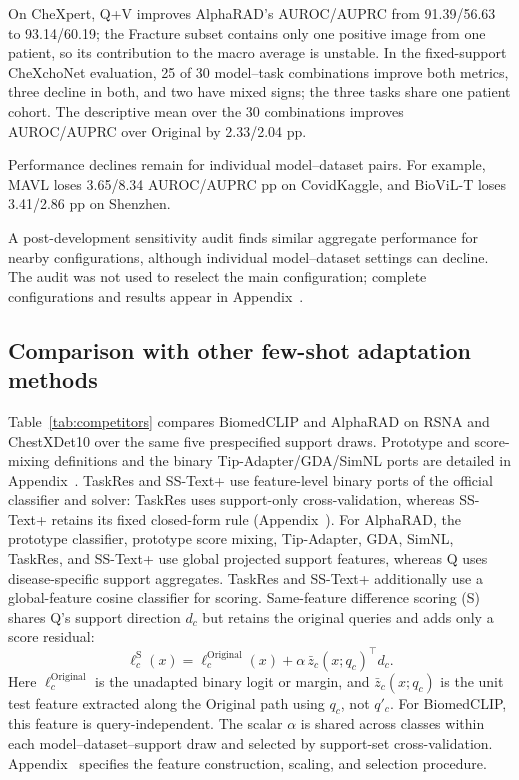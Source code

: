 \documentclass[10pt,twocolumn,letterpaper]{article}
\begin{document}
On CheXpert, Q+V improves AlphaRAD's AUROC/AUPRC from 91.39/56.63 to 93.14/60.19; the Fracture subset contains only one positive image from one patient, so its contribution to the macro average is unstable. In the fixed-support CheXchoNet evaluation, 25 of 30 model--task combinations improve both metrics, three decline in both, and two have mixed signs; the three tasks share one patient cohort. The descriptive mean over the 30 combinations improves AUROC/AUPRC over Original by 2.33/2.04 pp.

Performance declines remain for individual model--dataset pairs. For example, MAVL loses 3.65/8.34 AUROC/AUPRC pp on CovidKaggle, and BioViL-T loses 3.41/2.86 pp on Shenzhen.

A post-development sensitivity audit finds similar aggregate performance for nearby configurations, although individual model--dataset settings can decline. The audit was not used to reselect the main configuration; complete configurations and results appear in Appendix~.

\subsection{Comparison with other few-shot adaptation methods}
\label{sec:competitors}
Table~\ref{tab:competitors} compares BiomedCLIP and AlphaRAD on RSNA and ChestXDet10 over the same five prespecified support draws. Prototype and score-mixing definitions and the binary Tip-Adapter/GDA/SimNL ports are detailed in Appendix~. TaskRes and SS-Text+ use feature-level binary ports of the official classifier and solver: TaskRes uses support-only cross-validation, whereas SS-Text+ retains its fixed closed-form rule (Appendix~). For AlphaRAD, the prototype classifier, prototype score mixing, Tip-Adapter, GDA, SimNL, TaskRes, and SS-Text+ use global projected support features, whereas Q uses disease-specific support aggregates. TaskRes and SS-Text+ additionally use a global-feature cosine classifier for scoring. Same-feature difference scoring (S) shares Q's support direction $d_c$ but retains the original queries and adds only a score residual:
\begin{equation}
\ell_c^{\mathrm S}(x)=\ell_c^{\mathrm{Original}}(x)
+\alpha\,\bar z_c(x;q_c)^\top d_c.
\label{eq:same_feature_score}
\end{equation}
Here $\ell_c^{\mathrm{Original}}$ is the unadapted binary logit or margin, and $\bar z_c(x;q_c)$ is the unit test feature extracted along the Original path using $q_c$, not $q'_c$. For BiomedCLIP, this feature is query-independent. The scalar $\alpha$ is shared across classes within each model--dataset--support draw and selected by support-set cross-validation. Appendix~ specifies the feature construction, scaling, and selection procedure.
\end{document}
